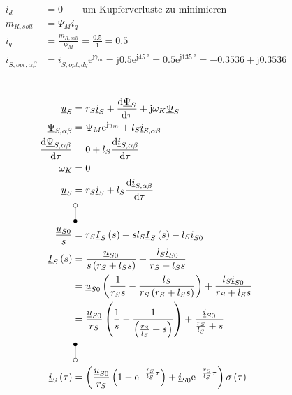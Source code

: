 \documentclass[11pt,a4paper]{scrartcl}
\newcommand{\mybr}[1]{\left(#1\right)}
\renewcommand{\j}{\mathrm{j}}
\renewcommand{\u}{\underline{u}}
\newcommand{\I}{\underline{I}}
\renewcommand{\i}{\underline{i}}
\newcommand{\PPsi}{\underline{\Psi}}
\newcommand{\0}{_{\mybr{0}}}
\newcommand{\1}{_{\mybr{1}}}
\newcommand{\2}{_{\mybr{2}}}
\renewcommand{\e}{\mathrm{e}}
\renewcommand{\d}{\mathrm{d}}
\newcommand{\isab}{\i_{S,\alpha\beta}}
\newcommand{\psab}{\PPsi_{S,\alpha\beta}}
\begin{document}
\section{}
\begin{align}
	i_d&=0\quad\quad\text{um Kupferverluste zu minimieren}\\
	m_{R,soll}&=\Psi_M i_q\\
	i_q&=\frac{m_{R,soll}}{\Psi_M}=\frac{\num{0.5}}{1}=\num{0.5}\\
	\i_{S,opt,\alpha\beta}&=\i_{S,opt,dq}\e^{\j\gamma_m}=\j\num{0.5}\e^{\j\SI{45}{\degree}}=\num{0.5}\e^{\j\SI{135}{\degree}}=-\num{0.3536}+\j\num{0.3536}
\end{align}

\section{}
\begin{align}
	\u_S&=r_S\i_S+\frac{\d\PPsi_S}{\d\tau}+\j\omega_K\PPsi_S\\
	\psab&=\Psi_M\e^{\j\gamma_m}+l_S\isab\\
	\frac{\d\psab}{\d\tau}&=0+l_S\frac{\d\isab}{\d\tau}\\
	\omega_K&=0\\
	\u_S&=r_S\i_S+l_S\frac{\d\isab}{\d\tau}\\
	&\rotatebox[origin=c]{270}{\laplace}\nonumber\\
	\frac{\u_{S0}}{s}&=r_S\I_S\mybr{s}+s l_S\I_S\mybr{s}-l_S \i_{S0}\\
	\I_S\mybr{s}&=\frac{\u_{S0}}{s\mybr{r_S+l_S s}}+\frac{l_S \i_{S0}}{r_S+l_S s}\\
	&=\u_{S0}\mybr{\frac{1}{r_S s}-\frac{l_S}{r_S\mybr{r_S+l_S s}}}+\frac{l_S \i_{S0}}{r_S+l_S s}\\
	&=\frac{\u_{S0}}{r_S}\mybr{\frac{1}{s}-\frac{1}{\mybr{\frac{r_S}{l_S}+ s}}}+\frac{\i_{S0}}{\frac{r_S}{l_S}+ s}\\
	&\rotatebox[origin=c]{270}{\Laplace}\nonumber\\
	\i_S\mybr{\tau}&=\mybr{\frac{\u_{S0}}{r_S}\mybr{1-\e^{-\frac{r_S}{l_S}\tau}}+\i_{S0}\e^{-\frac{r_S}{l_S}\tau}}\sigma\mybr{\tau}
\end{align}
\end{document}
